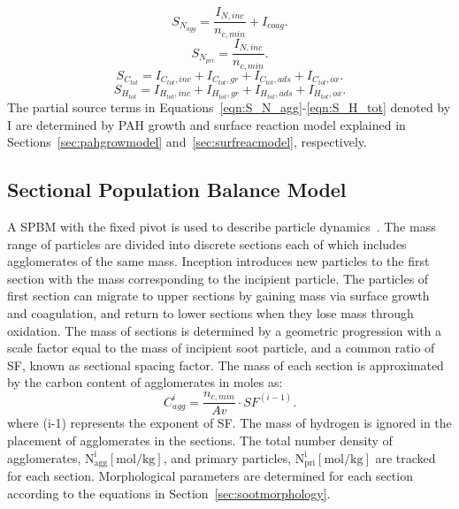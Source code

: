 \begin{equation}
	S_{N_{agg}} = \frac{I_{N,inc}}{n_{c,min}}+I_{coag}
	\label{eqn:S_N_agg}.
\end{equation}
\begin{equation}
	S_{N_{pri}} = \frac{I_{N,inc}}{n_{c,min}}
	\label{eqn:S_N_pri}.
\end{equation}
\begin{equation}
	S_{C_{tot}} = I_{C_{tot},inc}+I_{C_{tot},gr}+I_{C_{tot},ads}+I_{C_{tot},ox}
	\label{eqn:S_C_tot}.
\end{equation}
\begin{equation}
	S_{H_{tot}} = I_{H_{tot},inc}+I_{H_{tot},gr}+I_{H_{tot},ads}+I_{H_{tot},ox}
	\label{eqn:S_H_tot}.
\end{equation}
The partial source terms in Equations~\ref{eqn:S_N_agg}-\ref{eqn:S_H_tot} denoted by $\mathrm{I}$ are determined by PAH growth and surface reaction model explained in Sections~\ref{sec:pahgrowmodel} and~\ref{sec:surfreacmodel}, respectively.

\subsection{Sectional Population Balance Model}
A SPBM with the fixed pivot is used to describe particle dynamics~\citep{wu1988discrete}. The mass range of particles are divided into discrete sections each of which includes agglomerates of the same mass. Inception introduces new particles to the first section with the mass corresponding to the incipient particle. The particles of first section can migrate to upper sections by gaining mass via surface growth and coagulation, and return to lower sections when they lose mass through oxidation. The mass of sections is determined by a geometric progression with a scale factor equal to the mass of incipient soot particle, and a common ratio of SF, known as sectional spacing factor. The mass of each section is approximated by the carbon content of agglomerates in moles as:
\begin{equation}
	C^i_{agg} = \frac{n_{c,min}}{Av}\cdot SF^{(i-1)}
	\label{eqn:Caggsec}.
\end{equation}
\noindent where (i-1) represents the exponent of SF. The mass of hydrogen is ignored in the placement of agglomerates in the sections.
The total number density of agglomerates, $\mathrm{N^i_{agg} [mol/kg]}$, and primary particles, $\mathrm{N^i_{pri} [mol/kg]}$ are tracked for each section. Morphological parameters are determined for each section according to the equations in Section~\ref{sec:sootmorphology}.

